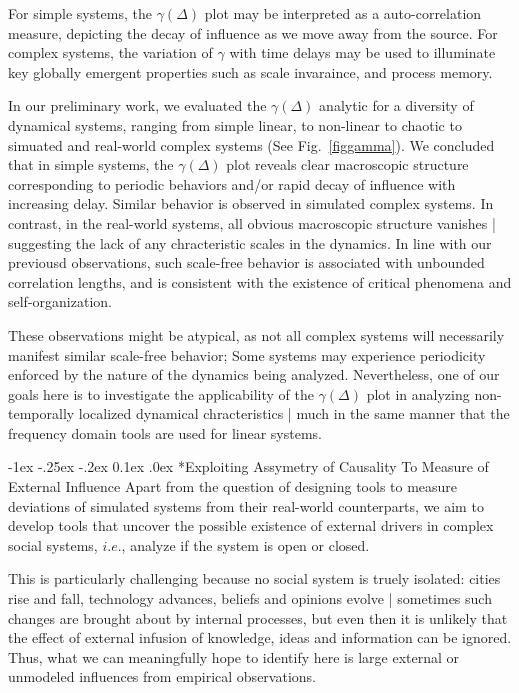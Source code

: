 \documentclass[onecolumn, compsoc,11pt]{IEEEtran}
\makeatletter
\renewcommand\subsection{\@startsection {section}{1}{\z@}%
  {-1ex \@plus -.25ex \@minus -.2ex}%
  {0.1ex \@plus.0ex}%
  {\fontsize{11}{10}\selectfont\bfseries\sffamily\color{DodgerBlue4}}}
\makeatother
\begin{document}
For simple systems, the $\gamma(\Delta)$ plot may be interpreted as a auto-correlation measure, depicting the decay of influence as we move away from the source. For complex systems, the variation of $\gamma$ with time delays may be used to illuminate key globally emergent properties such as scale invaraince, and process memory.

In our preliminary work, we evaluated the $\gamma(\Delta)$ analytic for a diversity of dynamical systems, ranging from simple linear, to non-linear to chaotic to simuated and real-world complex systems (See Fig.~\ref{figgamma}).
We concluded that in simple systems, the $\gamma(\Delta)$ plot reveals clear macroscopic structure corresponding to periodic behaviors and/or rapid decay of influence with increasing delay. Similar behavior is observed in simulated complex systems. In contrast, in the real-world systems, all obvious macroscopic  structure vanishes | suggesting the lack of any chracteristic  scales in  the dynamics. In line with our previousd observations, such scale-free behavior is associated with unbounded correlation lengths, and is consistent with the existence  of critical phenomena and self-organization.

These observations might  be atypical, as not all complex systems will necessarily manifest similar scale-free behavior; Some systems may experience periodicity enforced by  the nature of the dynamics being analyzed. Nevertheless, one of our goals here is to investigate the applicability of the  $\gamma(\Delta)$ plot in  analyzing non-temporally localized dynamical chracteristics | much in the same manner that the frequency domain tools are used for linear systems.

\subsection*{Exploiting Assymetry of Causality To Measure  of External Influence}
Apart from the question of designing tools to measure  deviations of simulated systems from their real-world counterparts, we aim to develop tools that
uncover the possible existence of external drivers in  complex social systems, $i.e.$, analyze if the system is open or closed.
 
This is particularly challenging because no social system is truely isolated: cities rise and fall, technology advances, beliefs and opinions evolve | sometimes such changes are brought about by internal processes, but even then it is unlikely that the effect of external infusion of knowledge, ideas and information can be ignored. Thus, what we can meaningfully hope to identify here is large external or unmodeled  influences from empirical observations.
\end{document}
